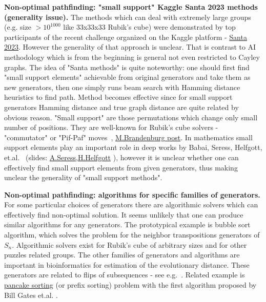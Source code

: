 \documentclass[atmp]{ipart_v1}
\numberwithin{equation}{section}
\theoremstyle{plain}%
\begin{document}
{\bf Non-optimal pathfinding: "small support" Kaggle Santa 2023 methods (generality issue).} The methods which can deal with extremely large groups (e.g. size $>10^{1000}$ like 33x33x33 Rubik's cube) were demonstrated by top participants of the recent challenge organized on the Kaggle platform - \href{https://www.kaggle.com/competitions/santa-2023}{Santa 2023}. However the generality of that approach is unclear.%
That is contrast to AI methodology which is from the beginning is  general not even restricted to Cayley graphs. The idea of "Santa methods" is quite noteworthy:  one should first find "small support elements" achievable from original generators and take them as new generators, then one simply runs beam search with Hamming distance heuristics to find path. Method becomes effective since for small support generators Hamming distance and true graph distance are  quite related by obvious reason. "Small support" are those permutations which change only small number of positions. They are well-known for  Rubik's cube solvers - "commutator" or "Pif-Paf" moves~\cite{mulholland2016permutation}, \href{https://math.stackexchange.com/q/4962862/21498}{M.Brandenburg post}. In mathematics small support elements play an important role in deep works by Babai, Seress, Helfgott, et.al.~\cite{babai1988diameter, babai2004diameter, bamberg2014bounds, helfgott2014diameter, helfgott2019growth} (slides: \href{https://www.math.auckland.ac.nz/~conder/SODO-2012/Seress-SODO2012.pdf}{A.Seress},\href{https://simons.berkeley.edu/sites/default/files/docs/6206/symtalk.pdf}{H.Helfgott} ), however it is 
unclear whether one can effectively find small support elements from given generators, thus making unclear the generality of "small support methods".

{\bf Non-optimal pathfinding: algorithms for specific families of generators.} 
For some particular choices of generators there are algorithmic solvers which can effectively find non-optimal solution. It seems unlikely that one can produce similar algorithms for any generators. The prototypical example is bubble sort algorithm, which solves the problem for the neighbor transpositions generators of $S_n$. Algorithmic solvers exist for Rubik's cube of arbitrary sizes and for other puzzles related groups. The other families of generators  and algorithms are important in bioinformatics for estimation of the evolutionary distance. These generators are related to flips of subsequences - see e.g.~\cite{Pevzner1995human2mice, Pevzner1999cabbage2turnip, wilson2024cayley, bulteau2019parameterized}. Related example is \href{https://en.wikipedia.org/wiki/Pancake_sorting}{pancake sorting} (or prefix sorting) problem with the first algorithm proposed by Bill Gates et.al. \cite{gates1979bounds}.
\end{document}
